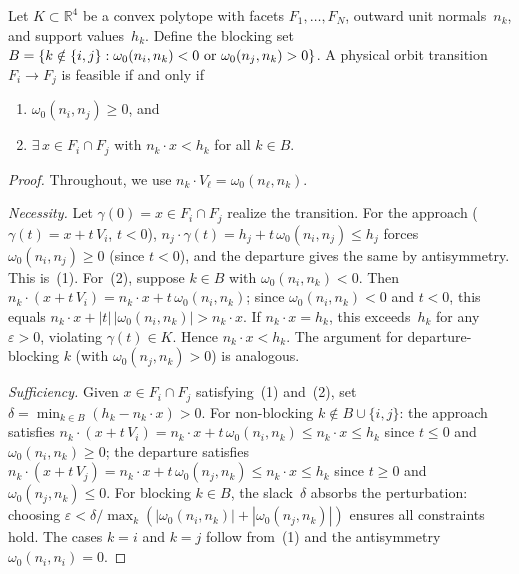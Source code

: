 \begin{lemma}
\label{lem:transition-feasibility}
Let $K \subset \mathbb{R}^4$ be a convex polytope with facets
$F_1, \ldots, F_N$, outward unit normals~$n_k$, and support values~$h_k$.
Define the blocking set
$B = \{k \notin \{i,j\} : \omega_0(n_i, n_k) < 0
  \textup{ or } \omega_0(n_j, n_k) > 0\}$.
A physical orbit transition $F_i \to F_j$ is feasible if and only if
\begin{enumerate}
  \item $\omega_0(n_i, n_j) \ge 0$, and
  \item $\exists\, x \in F_i \cap F_j$ with
    $n_k \cdot x < h_k$ for all $k \in B$.
\end{enumerate}
\end{lemma}

\begin{proof}
Throughout, we use $n_k \cdot V_\ell = \omega_0(n_\ell, n_k)$.

\emph{Necessity.}
Let $\gamma(0) = x \in F_i \cap F_j$ realize the transition.
For the approach ($\gamma(t) = x + t\, V_i$, $t < 0$),
$n_j \cdot \gamma(t) = h_j + t\, \omega_0(n_i, n_j) \le h_j$
forces $\omega_0(n_i, n_j) \ge 0$ (since $t < 0$),
and the departure gives the same by antisymmetry. This is~(1).
For~(2), suppose $k \in B$ with $\omega_0(n_i, n_k) < 0$.
Then $n_k \cdot (x + t\, V_i) = n_k \cdot x + t\,\omega_0(n_i, n_k)$;
since $\omega_0(n_i, n_k) < 0$ and $t < 0$, this equals
$n_k \cdot x + |t|\,|\omega_0(n_i, n_k)| > n_k \cdot x$.
If $n_k \cdot x = h_k$, this exceeds~$h_k$ for any $\varepsilon > 0$,
violating $\gamma(t) \in K$.
Hence $n_k \cdot x < h_k$.
The argument for departure-blocking $k$ (with $\omega_0(n_j, n_k) > 0$)
is analogous.

\emph{Sufficiency.}
Given $x \in F_i \cap F_j$ satisfying~(1) and~(2),
set $\delta = \min_{k \in B} (h_k - n_k \cdot x) > 0$.
For non-blocking $k \notin B \cup \{i,j\}$:
the approach satisfies
$n_k \cdot (x + t\, V_i) = n_k \cdot x + t\,\omega_0(n_i, n_k) \le n_k \cdot x \le h_k$
since $t \le 0$ and $\omega_0(n_i, n_k) \ge 0$;
the departure satisfies
$n_k \cdot (x + t\, V_j) = n_k \cdot x + t\,\omega_0(n_j, n_k) \le n_k \cdot x \le h_k$
since $t \ge 0$ and $\omega_0(n_j, n_k) \le 0$.
For blocking $k \in B$, the slack~$\delta$ absorbs the perturbation:
choosing $\varepsilon < \delta / \max_k(|\omega_0(n_i, n_k)| + |\omega_0(n_j, n_k)|)$
ensures all constraints hold.
The cases $k = i$ and $k = j$ follow from~(1) and
the antisymmetry $\omega_0(n_i, n_i) = 0$.
\end{proof}

